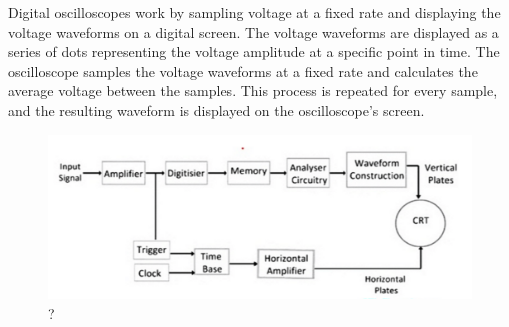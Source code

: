 Digital oscilloscopes work by sampling voltage at a fixed rate and displaying the voltage waveforms on a digital screen. The voltage waveforms are displayed as a series of dots representing the voltage amplitude at a specific point in time. The oscilloscope samples the voltage waveforms at a fixed rate and calculates the average voltage between the samples. This process is repeated for every sample, and the resulting waveform is displayed on the oscilloscope’s screen.

\begin{figure}[H]
	\centering
	\includegraphics[width=12cm]{images/img_1.png}
	\caption{?}
	\label{fig:dunno-vol-2}
\end{figure}


















